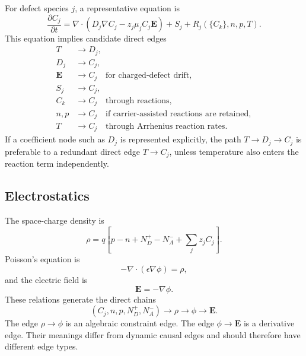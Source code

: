 \documentclass[11pt]{article}
\newcommand{\Evec}{\bm{E}}
\begin{document}
For defect species \(j\), a representative equation is
\begin{equation}
\frac{\partial C_j}{\partial t}
=
\nabla\cdot\left(D_j\nabla C_j-z_j\mu_j C_j\Evec\right)
+S_j
+R_j(\{C_k\},n,p,T).
\label{eq:defect_evolution}
\end{equation}
This equation implies candidate direct edges
\begin{align}
T&\rightarrow D_j,\\
D_j&\rightarrow C_j,\\
\Evec&\rightarrow C_j \quad \text{for charged-defect drift},\\
S_j&\rightarrow C_j,\\
C_k&\rightarrow C_j \quad \text{through reactions},\\
n,p&\rightarrow C_j \quad \text{if carrier-assisted reactions are retained},\\
T&\rightarrow C_j \quad \text{through Arrhenius reaction rates}.
\end{align}
If a coefficient node such as \(D_j\) is represented explicitly, the path \(T\rightarrow D_j\rightarrow C_j\) is preferable to a redundant direct edge \(T\rightarrow C_j\), unless temperature also enters the reaction term independently.

\subsection{Electrostatics}

The space-charge density is
\begin{equation}
\rho
=q\left[p-n+N_D^+-N_A^-+\sum_j z_j C_j\right].
\label{eq:space_charge}
\end{equation}
Poisson's equation is
\begin{equation}
-\nabla\cdot\left(\epsilon\nabla\phi\right)=\rho,
\label{eq:poisson}
\end{equation}
and the electric field is
\begin{equation}
\Evec=-\nabla\phi.
\label{eq:electric_field}
\end{equation}
These relations generate the direct chains
\begin{equation}
(C_j,n,p,N_D^+,N_A^-)\rightarrow\rho\rightarrow\phi\rightarrow\Evec.
\end{equation}
The edge \(\rho\rightarrow\phi\) is an algebraic constraint edge. The edge \(\phi\rightarrow\Evec\) is a derivative edge. Their meanings differ from dynamic causal edges and should therefore have different edge types.
\end{document}
